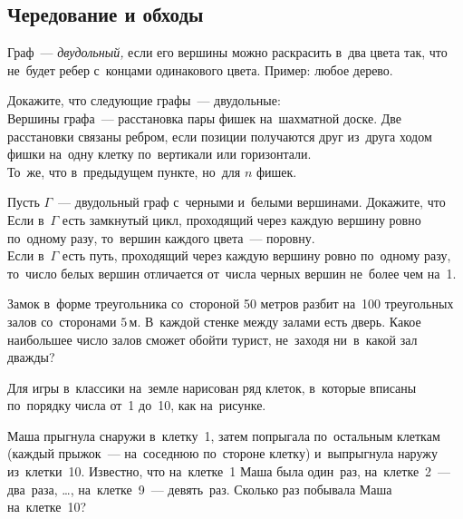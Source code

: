 \subsection*{Чередование и обходы}

Граф~--- \emph{двудольный,} если его вершины можно раскрасить в~два цвета так,
что не~будет ребер с~концами одинакового цвета.
Пример: любое дерево.

\begin{problems}

\item
Докажите, что следующие графы~--- двудольные:
\\
\sp
Вершины графа~--- расстановка пары фишек на~шахматной доске.
Две расстановки связаны ребром, если позиции получаются друг из~друга ходом
фишки на~одну клетку по~вертикали или горизонтали.
\\
\sp
То~же, что в~предыдущем пункте, но~для $n$ фишек.

\item
Пусть $\Gamma$~--- двудольный граф с~черными и~белыми вершинами.
Докажите, что
\\
\sp
Если в~$\Gamma$ есть замкнутый цикл, проходящий через каждую вершину ровно
по~одному разу, то~вершин каждого цвета~--- поровну.
\\
\sp
Если в~$\Gamma$ есть путь, проходящий через каждую вершину ровно по~одному
разу, то~число белых вершин отличается от~числа черных вершин не~более чем
на~1.

\item
Замок в~форме треугольника со~стороной 50 метров разбит на~100 треугольных
залов со~сторонами $5\,\text{м}$.
В~каждой стенке между залами есть дверь.
Какое наибольшее число залов сможет обойти турист, не~заходя ни~в~какой зал
дважды?

\item
Для игры в~классики на~земле нарисован ряд клеток, в~которые вписаны по~порядку
числа от~1 до~10, как на~рисунке.
\begin{center}
\end{center}
Маша прыгнула снаружи в~клетку~1, затем попрыгала по~остальным клеткам
(каждый прыжок~--- на~соседнюю по~стороне клетку) и~выпрыгнула наружу
из~клетки~10.
Известно, что на~клетке~1 Маша была один~раз, на~клетке~2~--- два~раза, \ldots,
на~клетке~9~--- девять~раз.
Сколько раз побывала Маша на~клетке~10?

\end{problems}

